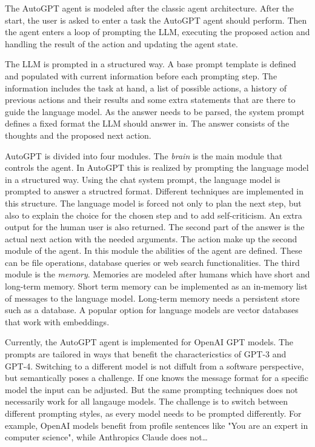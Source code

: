 \documentclass[../../main.tex]{subfiles}
\begin{document}
The AutoGPT agent is modeled after the classic agent architecture.
After the start,
the user is asked to enter a task the AutoGPT agent should perform.
Then the agent enters a loop of prompting the LLM,
executing the proposed action
and handling the result of the action and updating the agent state.

The LLM is prompted in a structured way.
A base prompt template is defined
and populated with current information before each prompting step.
The information includes the task at hand,
a list of possible actions,
a history of previous actions and their results
and some extra statements that are there to guide the language model.
As the answer needs to be parsed,
the system prompt defines a fixed format the LLM should answer in.
The answer consists of the thoughts and the proposed next action.

AutoGPT is divided into four modules.
The \textit{brain} is the main module that controls the agent.
In AutoGPT this is realized by prompting the language model in a structured way.
Using the chat system prompt,
the language model is prompted to answer a structred format.
Different techniques are implemented in this structure.
The language model is forced not only to plan the next step,
but also to explain the choice for the chosen step and to add self-criticism.
An extra output for the human user is also returned.
The second part of the answer is the actual next action with the needed arguments.
The action make up the second module of the agent.
In this module the abilities of the agent are defined.
These can be file operations,
database queries or web search functionalities.
The third module is the \textit{memory}.
Memories are modeled after humans which have short and long-term memory.
Short term memory can be implemented
as an in-memory list of messages to the language model.
Long-term memory needs a persistent store such as a database.
A popular option for language models are vector databases that work with embeddings.

Currently,
the AutoGPT agent is implemented for OpenAI GPT models.
The prompts are tailored in ways
that benefit the charactericstics of GPT-3 and GPT-4.
Switching to a different model is not diffult from a software perspective,
but semantically poses a challenge.
If one knows the message format for a specific model the input can be adjusted.
But the same prompting techniques does not necessarily work for all langauge models.
The challenge is to switch between different prompting styles,
as every model needs to be prompted differently.
For example,
OpenAI models benefit from profile sentences like "You are an expert in computer science",
while Anthropics Claude does not\dots
\end{document}
